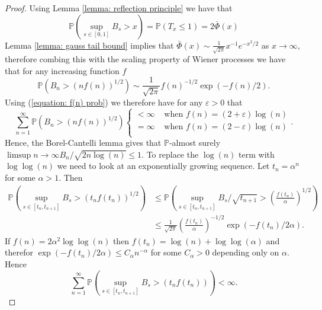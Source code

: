 \documentclass{article}
\begin{document}
\begin{proof}
Using Lemma \ref{lemma: reflection principle} we have that
\begin{equation}
\mathbb{P} \left ( \sup_{s \in [0,1]} B_s > x \right ) = \mathbb{P} \left ( T_x \leq 1 \right ) = 2 \bar{\Phi} \left ( x \right ) 
\end{equation}
Lemma \ref{lemma: gauss tail bound} implies that $\bar{\Phi} (x) \sim \frac{1}{\sqrt{2 \pi}} x^{-1} e^{-x^2/2}$ as $x \rightarrow \infty$, therefore combing this with the scaling property of Wiener processes we have that for any increasing function $f$
\begin{equation}
\mathbb{P} \left ( B_n > \left ( n f(n) \right ) ^ {1/2} \right ) \sim \frac{1}{\sqrt{2\pi}} f(n)^{-1/2} \exp \left ( - f(n) / 2 \right ). 
\label{equation: f(n) prob}
\end{equation}
Using (\ref{equation: f(n) prob}) we therefore have for any $\varepsilon > 0$ that 
\begin{equation}
\sum_{n = 1}^{\infty} \mathbb{P} \left ( B_n > \left ( n f(n) \right ) ^ {1/2} \right ) \left\{\begin{matrix}
< \infty & \text{ when } f(n) = (2 + \varepsilon ) \log (n) \\
= \infty & \text{ when } f(n) = (2 - \varepsilon ) \log (n)\\
\end{matrix}\right. .
\end{equation}
Hence, the Borel-Cantelli lemma gives that $\mathbb{P}$-almost surely $\limsup\limits{n \rightarrow \infty} B_{n} / \sqrt{2n \log (n)} \leq 1$. To replace the $\log (n)$ term with $\log \log (n)$ we need to look at an exponentially growing sequence. Let $t_n = \alpha^n$ for some $\alpha > 1$. Then
\begin{align}
\mathbb{P} \left ( \sup_{s \in [t_n, t_{n+1}]} B_s > \left ( t_n f (t_n) \right ) ^ {1/2} \right ) & \leq \mathbb{P} \left ( \sup_{s \in [t_n, t_{n+1}]} B_s / \sqrt{t_{n+1}} > \left ( \frac{f (t_n)}{\alpha} \right ) ^ {1/2} \right ) \\ 
& \leq \frac{1}{\sqrt{2\pi}} \left ( \frac{f(t_n)}{\alpha} \right ) ^ {-1/2} \exp \left ( - f (t_n) / 2 \alpha \right ).
\end{align}
If $f(n) = 2 \alpha^2 \log \log (n)$ then $f(t_n) = \log (n) + \log \log (\alpha)$ and therefor $\exp \left ( - f (t_n) / 2 \alpha \right ) \leq C_\alpha n^{-\alpha}$ for some $C_\alpha > 0$ depending only on $\alpha$. Hence
\begin{equation}
\sum_{n=1}^\infty \mathbb{P} \left ( \sup_{s \in [t_n, t_{n+1}]} B_s > \left ( t_n f (t_n) \right ) \right ) < \infty. 

\end{equation}
\end{proof}
\end{document}
